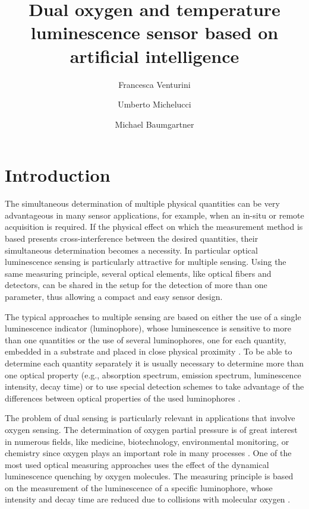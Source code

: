 \documentclass[9pt,twocolumn,twoside,pdftex]{optica}
\title{Dual oxygen and temperature luminescence sensor based on artificial intelligence}
\author[1,2,*]{Francesca Venturini}
\author[2]{Umberto Michelucci}
\author[1]{Michael Baumgartner}
\affil[1]{Institute of Applied Mathematics and Physics, Zurich University of Applied Sciences,
Technikumstrasse 9, 8401 Winterthur, Switzerland}
\affil[2]{TOELT LLC; Birchlenstr. 25, 8600 Dübendorf, Switzerland}
\affil[*]{Corresponding author: francesca.venturini@zhaw.ch}
\begin{document}
\maketitle

\section{Introduction}

The simultaneous determination of multiple physical quantities can be very advantageous in many sensor applications, for example, when an in-situ or remote acquisition is required. 
If the physical effect on which the measurement method is based presents cross-interference between the desired quantities, their simultaneous determination becomes a necessity.
In particular optical luminescence sensing is particularly attractive for multiple sensing. Using the same measuring principle, several optical elements, like optical fibers and detectors, can be shared in the setup for the detection of more than one parameter, thus allowing a compact and easy sensor design.

The typical approaches to multiple sensing are based on either the use of a single luminescence indicator (luminophore), whose luminescence is sensitive to more than one quantities or the use of several luminophores, one for each quantity, embedded in a substrate and placed in close physical proximity \cite{Stich2010,Borisov2011novel,Kameya2014,Wang2014,Santoro2016,Biring2019}. To be able to determine each quantity separately it is usually necessary to determine more than one optical property (e.g., absorption spectrum, emission spectrum, luminescence intensity, decay time) or to use special detection schemes to take advantage of the differences between optical properties of the used luminophores \cite{Collier2013,Wang2014,Stehning2004,Jorge2008,Biring2019,Moore2006}. 

The problem of dual sensing is particularly relevant in applications that involve oxygen sensing. The determination of oxygen partial pressure is of great interest in numerous fields, like medicine, biotechnology, environmental monitoring, or chemistry since oxygen plays an important role in many processes \cite{Papkovsky2013,Wang2014}. One of the most used optical measuring approaches uses the effect of the dynamical luminescence quenching by oxygen molecules. The measuring principle is based on the measurement of the luminescence of a specific luminophore, whose intensity and decay time are reduced due to collisions with molecular oxygen \cite{Lakowicz2006}.
\end{document}
